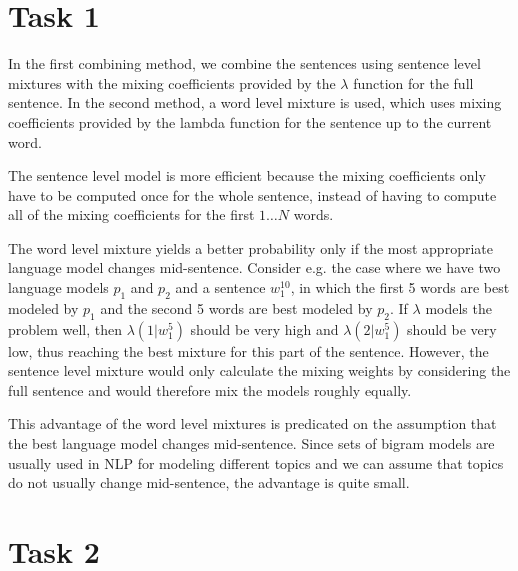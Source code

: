 \documentclass[%
   11pt,              %
   ngerman,           %
   a4paper,           %
   DIV11,             %
]{scrartcl}%
\begin{document}
\section*{Task 1}

In the first combining method, we combine the sentences using sentence level mixtures with the mixing coefficients provided by the $\lambda$ function for the full sentence. In the second method, a word level mixture is used, which uses mixing coefficients provided by the lambda function for the sentence up to the current word.

The sentence level model is more efficient because the mixing coefficients only have to be computed once for the whole sentence, instead of having to compute all of the mixing coefficients for the first $1\ldots N$ words. 

The word level mixture yields a better probability only if the most appropriate language model changes mid-sentence. Consider e.g. the case where we have two language models $p_1$ and $p_2$ and a sentence $w_1^{10}$, in which the first 5 words are best modeled by $p_1$ and the second 5 words are best modeled by $p_2$. If $\lambda$ models the problem well, then $\lambda (1|w_1^5)$ should be very high and $\lambda (2|w_1^5)$ should be very low, thus reaching the best mixture for this part of the sentence. However, the sentence level mixture would only calculate the mixing weights by considering the full sentence and would therefore mix the models roughly equally.

This advantage of the word level mixtures is predicated on the assumption that the best language model changes mid-sentence. Since sets of bigram models are usually used in NLP for modeling different topics and we can assume that topics do not usually change mid-sentence, the advantage is quite small.


\section*{Task 2}
\end{document}
